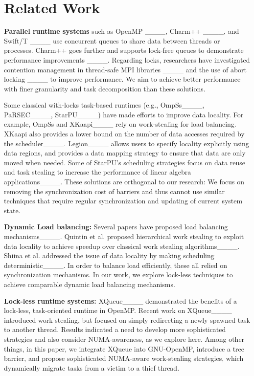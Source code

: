 \section{Related Work}
\label{sec:related-work}

\textbf{Parallel runtime systems} 
such as OpenMP ____, Charm++ ____, and Swift/T ____ use concurrent queues to share data between threads or processes.
Charm++ goes further and supports lock-free queues to demonstrate performance improvements ____.
Regarding locks, researchers have investigated contention management in thread-safe MPI libraries ____ and the use of abort locking ____ to improve performance.
We aim to achieve better performance with finer granularity and task decomposition than these solutions.

Some classical with-locks task-based runtimes (e.g., OmpSs____, PaRSEC____, StarPU____) have made efforts to improve data locality. 
For example, OmpSs and XKaapi____ rely on work-stealing for load balancing.
XKaapi also provides a lower bound on the number of data accesses required by the scheduler____.
Legion____ allows users to specify locality explicitly using data regions, and provides a data mapping strategy to ensure that data are only moved when needed.
Some of StarPU's scheduling strategies focus on data reuse and task stealing to increase the performance of linear algebra applications____.
These solutions are orthogonal to our research: We focus on removing the synchronization cost of barriers and thus cannot use similar techniques that require regular synchronization and updating of current system state.

\textbf{Dynamic Load balancing:}
Several papers have proposed load
balancing mechanisms____.
Quintin et al. proposed hierarchical work stealing to exploit data
locality to achieve speedup over classical work stealing algorithms____. 
Shiina et al. addressed the issue of data locality by making scheduling deterministic____.
In order to balance load efficiently, these all relied on synchronization mechanisms.
In our work, we explore lock-less techniques to achieve comparable dynamic load balancing mechanisms.

\textbf{Lock-less runtime systems:}
XQueue____ demonstrated the benefits of a lock-less, task-oriented runtime in OpenMP.  
Recent work on XQueue____ introduced work-stealing, but focused on simply redirecting a newly spawned task to another thread. Results indicated a need to develop more sophisticated strategies and also consider NUMA-awareness, as we explore here.
Among other things, in this paper, we integrate XQueue into GNU-OpenMP, introduce a tree barrier, and propose sophisticated NUMA-aware work-stealing strategies, which dynamically migrate tasks from a victim to a thief thread.


